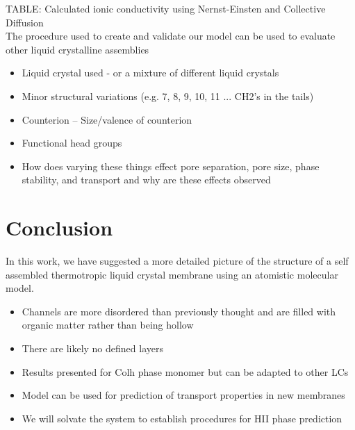 \documentclass{article}
\begin{document}
	TABLE: Calculated ionic conductivity using Nernst-Einsten and Collective Diffusion
	\\
	The procedure used to create and validate our model can be used to evaluate other liquid crystalline assemblies
	\begin{itemize}
		\item Liquid crystal used - or a mixture of different liquid crystals
		\item Minor structural variations (e.g. 7, 8, 9, 10, 11 ... CH2's in the tails)
		\item Counterion -- Size/valence of counterion
		\item Functional head groups
		\item How does varying these things effect pore separation, pore size, phase stability, and transport and why are these effects observed
	\end{itemize} 
	
	\section{Conclusion}
	
	In this work, we have suggested a more detailed picture of the structure of a self assembled thermotropic liquid crystal membrane using an atomistic molecular model.
	\begin{itemize}
		\item Channels are more disordered than previously thought and are filled with organic matter rather than being hollow 
		\item There are likely no defined layers
		\item Results presented for Colh phase monomer but can be adapted to other LCs
		\item Model can be used for prediction of transport properties in new membranes
		\item We will solvate the system to establish procedures for HII phase prediction
	\end{itemize}
	
\end{document}

